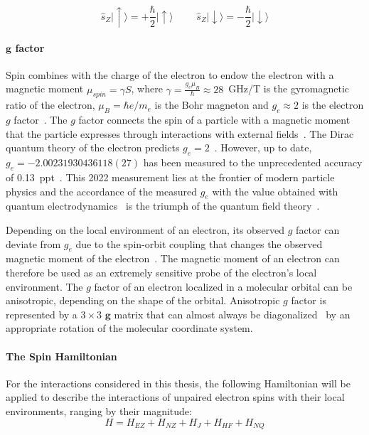 \begin{equation}
\label{eq:sz_states}
\hat{s}_Z\vert{\uparrow}\rangle = +\frac{\hbar}{2}\vert{\uparrow\rangle}\,\,\,\,\,\,\,\,\,\,\,\,\,\,\hat{s}_Z\vert{\downarrow\rangle}=-\frac{\hbar}{2}\vert{\downarrow\rangle}
\end{equation}


\paragraph*{$\textbf{g}$ factor}

Spin combines with the charge of the electron to endow the electron with a magnetic moment $\mu_{spin} = \gamma S$, where $\gamma=\frac{g_e\mu_B}{\hbar}\approx 28$~GHz/T is the gyromagnetic ratio of the electron, $\mu_B=\hbar e/m_e$ is the Bohr magneton and $g_e \approx 2$ is the electron $g$ factor~\cite{Carrington_g_factor}. The $g$ factor connects the spin of a particle with a magnetic moment that the particle expresses through interactions with external fields~\cite{Schwinger1948}. The Dirac quantum theory of the electron predicts $g_e=2$~\cite{dirac1928}. However, up to date, $g_e=-2.00231930436118(27)$ has been measured to the unprecedented accuracy of 0.13~ppt~\cite{Fan2023_PRL}. This 2022 measurement lies at the frontier of modern particle physics and the accordance of the measured $g_e$ with the value obtained with quantum electrodynamics~\cite{Schwinger1948,Fan2023_PRL} is the triumph of the quantum field theory~\cite{Feynman_1949}. 
\par
Depending on the local environment of an electron, its observed $g$ factor can deviate from $g_e$ due to the spin-orbit coupling that changes the observed magnetic moment of the electron~\cite{Carrington_g_factor}. The magnetic moment of an electron can therefore be used as an extremely sensitive probe of the electron's local environment. The $g$ factor of an electron localized in a molecular orbital can be anisotropic, depending on the shape of the orbital. Anisotropic $g$ factor is represented by a $3\times3$ $\textbf{g}$ matrix that can almost always be diagonalized~\cite{Carrington_g_factor} by an appropriate rotation of the molecular coordinate system.

\paragraph*{The Spin Hamiltonian}
For the interactions considered in this thesis, the following Hamiltonian will be applied to describe the interactions of unpaired electron spins with their local environments, ranging by their magnitude:
\begin{equation}
\label{spin_hamiltonian}
H = H_{EZ} + H_{NZ} + H_{J} + H_{HF} + H_{NQ}
\end{equation}

